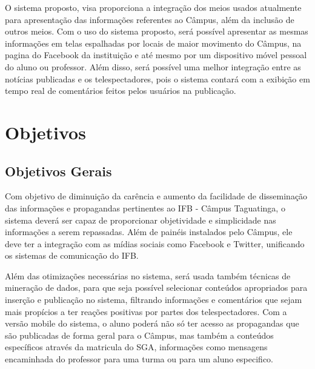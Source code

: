 O sistema proposto, visa proporciona a integração dos meios usados atualmente para apresentação das informações referentes ao Câmpus, além da inclusão de outros meios. Com o uso do sistema proposto, será possível apresentar as mesmas informações em telas espalhadas por locais de maior movimento do Câmpus, na pagina do Facebook da instituição e até mesmo por um dispositivo móvel pessoal do aluno ou professor. Além disso, será possível uma melhor integração entre as notícias publicadas e os telespectadores, pois o sistema contará com a exibição em tempo real de comentários feitos pelos usuários na publicação.

\section{Objetivos}
\subsection{Objetivos Gerais}
	Com objetivo de diminuição da carência e aumento da facilidade de disseminação das informações e propagandas pertinentes ao IFB - Câmpus Taguatinga, o sistema deverá ser capaz de proporcionar objetividade e simplicidade nas informações a serem repassadas. Além de painéis instalados pelo Câmpus, ele deve ter a integração com as mídias sociais como Facebook e Twitter, unificando os sistemas de comunicação do IFB.
	
	 Além das otimizações necessárias no sistema, será usada também técnicas de mineração de dados, para que seja possível selecionar conteúdos apropriados para inserção e publicação no sistema, filtrando informações e comentários que sejam mais propícios a ter reações positivas por partes dos telespectadores. Com a versão mobile do sistema, o aluno poderá não só ter acesso as propagandas que são publicadas de forma geral para o Câmpus, mas também a conteúdos específicos através da matricula do SGA, informações como mensagens encaminhada do professor para uma turma ou para um aluno especifico.


